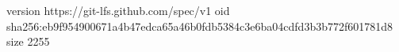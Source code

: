 version https://git-lfs.github.com/spec/v1
oid sha256:eb9f954900671a4b47edca65a46b0fdb5384c3e6ba04cdfd3b3b772f601781d8
size 2255
